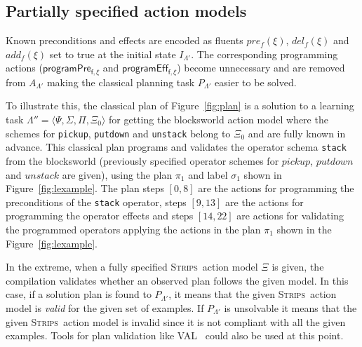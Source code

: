 \documentclass[letterpaper]{article} %
\newcommand{\tup}[1]{{\langle #1 \rangle}}
\newcommand{\strips}{\textsc{Strips}}     %
\begin{document}
\subsection{Partially specified action models}
Known preconditions and effects are encoded as fluents $pre_f(\xi)$, $del_f(\xi)$ and $add_f(\xi)$ set to true at the initial state $I_{\Lambda'}$. The corresponding programming actions ($\mathsf{programPre_{f,\xi}}$ and $\mathsf{programEff_{f,\xi}}$) become unnecessary and are removed from $A_{\Lambda'}$ making the classical planning task $P_{\Lambda'}$ easier to be solved.

To illustrate this, the classical plan of Figure~\ref{fig:plan} is a solution to a learning task $\Lambda''=\tup{\Psi,\Sigma,\Pi,\Xi_0}$ for getting the blocksworld action model where the schemes for {\tt\small pickup}, {\tt\small putdown} and {\tt\small unstack} belong to $\Xi_0$ and are fully known in advance. This classical plan programs and validates the operator schema {\tt\small stack} from the blocksworld (previously specified operator schemes for $pickup$, $putdown$ and $unstack$ are given), using the plan $\pi_1$ and label $\sigma_1$ shown in Figure~\ref{fig:lexample}. The plan steps $[0,8]$ are the actions for programming the preconditions of the {\tt\small stack} operator, steps $[9,13]$ are the actions for programming the operator effects and steps $[14,22]$ are actions for validating the programmed operators applying the actions in the plan $\pi_1$ shown in the Figure~\ref{fig:lexample}.

In the extreme, when a fully specified \strips\ action model $\Xi$ is given, the compilation validates whether an observed plan follows the given model. In this case, if a solution plan is found to $P_{\Lambda'}$, it means that the given \strips\ action model is {\em valid} for the given set of examples. If $P_{\Lambda'}$ is unsolvable it means that the given \strips\ action model is invalid since it is not compliant with all the given examples. Tools for plan validation like VAL~\cite{howey2004val} could also be used at this point.
\end{document}

